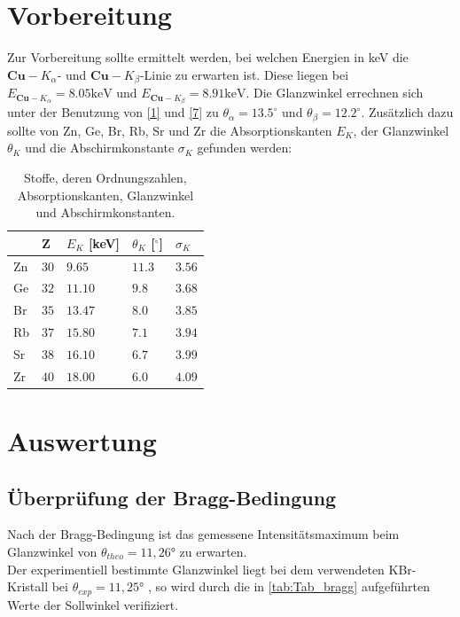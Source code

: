 \documentclass[a4paper]{scrartcl}
\begin{document}
\section{Vorbereitung}
Zur Vorbereitung sollte ermittelt werden, bei welchen Energien in keV die $\mathbf{Cu}-K_{\alpha}$- und $\mathbf{Cu}-K_{\beta}$-Linie zu erwarten ist. Diese liegen bei $E_{\mathbf{Cu}-K_{\alpha}}=8.05 \si{\keV}$ und $E_{\mathbf{Cu}-K_{\beta}}=8.91 \si{\keV}$. Die Glanzwinkel errechnen sich unter der Benutzung von \eqref{1} und \eqref{7} zu $\theta_{\alpha}=13.5^\circ$ und $\theta_{\beta}=12.2^\circ$.
Zusätzlich dazu sollte von Zn, Ge, Br, Rb, Sr und Zr die Absorptionskanten $E_{K}$, der Glanzwinkel $\theta_{K}$ und die Abschirmkonstante $\sigma_{K}$ gefunden werden:
\begin{table}[H]
  \centering
  \begin{tabular}{l|l|l|l|l}
  & Z & $E_{K}$ [keV] & $\theta_{K}$ [$^{\circ}$] & $\sigma_{K}$ \\\hline
  Zn & $30$ & $9.65$ & $11.3$ & $3.56$\\\hline
  Ge & $32$ & $11.10$ & $9.8$ & $3.68$\\\hline
  Br & $35$ & $13.47$ & $8.0$ & $3.85$\\\hline
  Rb & $37$ & $15.80$ & $7.1$ & $3.94$\\\hline
  Sr & $38$ & $16.10$ & $6.7$ & $3.99$\\\hline
  Zr & $40$ & $18.00$ & $6.0$ & $4.09$\\\hline
  \end{tabular}
  \caption{Stoffe, deren Ordnungszahlen, Absorptionskanten, Glanzwinkel und Abschirmkonstanten.}
  \label{tab:1}
\end{table}

\section{Auswertung}
\label{sec:Auswertung}



\subsection{Überprüfung der Bragg-Bedingung}
\label{subsec:bragg}
Nach der Bragg-Bedingung ist das gemessene Intensitätsmaximum beim Glanzwinkel von $\theta_{theo} = 11,26°$ zu erwarten. \\
Der experimentiell bestimmte Glanzwinkel liegt bei dem verwendeten KBr-Kristall bei $\theta_{exp}=11,25°$ , so wird durch die in \autoref{tab:Tab_bragg} aufgeführten Werte 
der Sollwinkel verifiziert. \\
\end{document}
